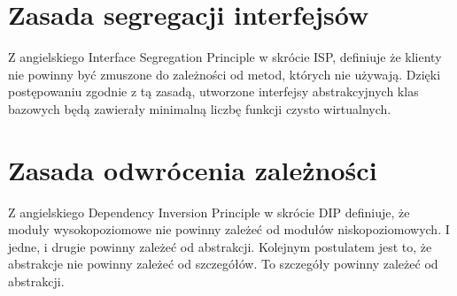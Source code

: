 \section{Zasada segregacji interfejsów}
Z angielskiego Interface Segregation Principle w skrócie ISP, definiuje że klienty nie powinny być zmuszone do zależności od metod, których nie używają.
\cite[151]{martin2015zwinne}
Dzięki postępowaniu zgodnie z tą zasadą, utworzone interfejsy abstrakcyjnych klas bazowych będą zawierały minimalną liczbę funkcji czysto wirtualnych.

\section{Zasada odwrócenia zależności}
Z angielskiego Dependency Inversion Principle w skrócie DIP definiuje, że moduły wysokopoziomowe nie powinny zależeć od modułów niskopoziomowych.
I jedne, i drugie powinny zależeć od abstrakcji.
\cite[141]{martin2015zwinne}
Kolejnym postulatem jest to, że abstrakcje nie powinny zależeć od szczegółów. To szczegóły powinny zależeć od abstrakcji.
\cite[141]{martin2015zwinne}
